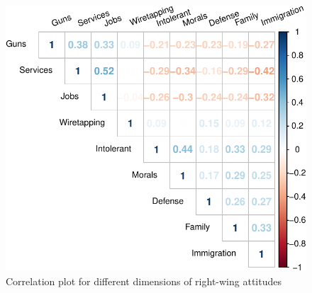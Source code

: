 \documentclass[12pt,]{article}
\begin{document}
\begin{figure}[htbp]
\centering
\includegraphics{figures/descriptives-1.pdf}
\caption{Correlation plot for different dimensions of right-wing
attitudes}
\end{figure}



\clearpage
\end{document}
